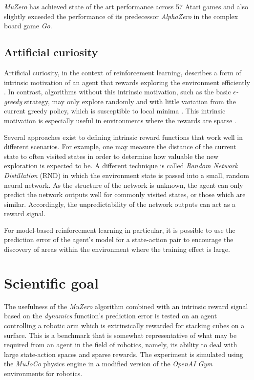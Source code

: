 \documentclass{article}
\begin{document}
\textit{MuZero} has achieved state of the art performance across 57 Atari games and also slightly exceeded the performance of its predecessor \textit{AlphaZero} in the complex board game \textit{Go}.

\subsection{Artificial curiosity}
Artificial curiosity, in the context of reinforcement learning, describes a form of intrinsic motivation of an agent that rewards exploring the environment efficiently \cite{curious}. In contrast, algorithms without this intrinsic motivation, such as the basic \textit{$\epsilon$-greedy} strategy, may only explore randomly and with little variation from the current greedy policy, which is susceptible to local minima \cite{sutton}. This intrinsic motivation is especially useful in environments where the rewards are sparse \cite{curious}.

Several approaches exist to defining intrinsic reward functions that work well in different scenarios. For example, one may measure the distance of the current state to often visited states in order to determine how valuable the new exploration is expected to be. A different technique is called \textit{Random Network Distillation} (RND) in which the environment state is passed into a small, random neural network. As the structure of the network is unknown, the agent can only predict the network outputs well for commonly visited states, or those which are similar. Accordingly, the unpredictability of the network outputs can act as a reward signal. \cite{curious}

For model-based reinforcement learning in particular, it is possible to use the prediction error of the agent's model for a state-action pair to encourage the discovery of areas within the environment where the training effect is large. \cite{curious}

\section{Scientific goal}
The usefulness of the \textit{MuZero} algorithm combined with an intrinsic reward signal based on the \textit{dynamics} function's prediction error is tested on an agent controlling a robotic arm which is extrinsically rewarded for stacking cubes on a surface. This is a benchmark that is somewhat representative of what may be required from an agent in the field of robotics, namely, its ability to deal with large state-action spaces and sparse rewards. The experiment is simulated using the \textit{MuJoCo} \cite{gym} physics engine in a modified version of the \textit{OpenAI Gym} \cite{gym} environments for robotics.
\end{document}
